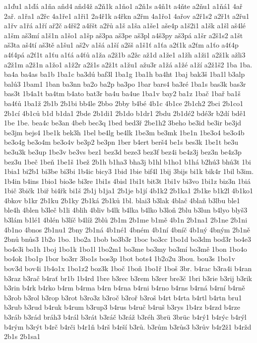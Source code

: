 {a1ďu1
a1ďá
a1ňa
aňd4
aňd4ž
a2ň1k
a1ňo1
a2ň1s
a4ň1t
a4ňte
a2ňu1
a1ňá1
4ař
2ař.
a1řa1
a2řc
4a1ře1
a1ři1
2a4ř1k
a4řkn
a2řm
4a1řo1
4ařov
a2ř1s2
a2ř1t
a2řu1
a1řv
a1řá
a1ří
ař2č
a4řš2
a4řšt
a2řů
a1š
a1ša
a1še1
aše4p
a1š2i1
a1šk
a1šl
aš4lé
a1šm
aš3mí
a1š1n
a1šo1
a1šp
aš3pa
aš3pe
aš3pl
a4š3py
aš3pá
a1šr
a2š1s2
a1št
aš3ta
aš4tí
aš3tě
a1šu1
aš2v
a1šá
a1ší
a2šš
a1š1ť
a1ťa
a2ť1k
a2ťm
a1ťo
a4ť4p
a4ť4pá
a2ť1t
a1ťu
a1ťá
a4ťů
a1ža
a2ž1b
a2žc
až1d
a1že1
a1žh
a1ži1
a2ž1k
ažli3
a2ž1m
a2ž1n
a1žo1
a1ž2r
a2ž1s
a2ž1t
a1žu1
ažu3r
a1žá
a1žé
a1ží
a2ž1š2
1ba
1ba.
ba4a
ba4as
ba1b
1ba1c
ba3dú
baf3l
1ba1g
1ba1h
ba4ht
1baj
bak3š
1ba1l
b3alp
balú3
1bam1
1ban
ba3nn
ba2o
ba2p
ba3po
1bar
bars4
ba3ré
1ba1s
bas3k
bas3r
bas3t
1b4a1t
ba4tm
b4ato
bat3r
ba4u
ba4ue
1ba1v
bay2
ba1z
1bač
1bař
ba1š
ba4ťů
1ba1ž
2b1b
2b1bi
bb4le
2bbo
2bby
b4bé
4b1c
4b1ce
2b1ch2
2bci
2b1co1
2b1cí
4b1ců
b1d
b1da1
2bde
2b1di1
2b1do
b1dr1
2bdu
2b1dé2
bdé3r
b2dí
bdě1
1be
1be.
bea4c
be3an
4beb
bec3q
1bed
bed3ř
2be1h2
3beho
be3id
be3ir
be3jd
be3jm
bejs4
1be1k
bek3h
1bel
be4lg
be4lk
1be3m
be3mk
1be1n
1be3o4
be3o4b
be3o4g
be3o4m
be3o4v
be3p2
be3pn
1ber
b4ert
berš4
be1s
bes3k
1be1t
be3u
be3u3k
be3up
1be3v
be3vs
bez1
bez3d
beze3
bez3f
bez4i
be4z3j
bez3n
be4z3p
bez3u
1beč
1beň
1be1š
1bež
2b1h
b1ha3
bha3j
b1hl
b1ho1
b1há
b2hú3
bhú3t
1bi
1bia1
bi2b1
bi3be
bi3bi
1b4ic
bicy3
1bid
1bie
bif4l
1bij
3bijs
bi1k
bik4r
1bil
b3im.
1b4in
b4ins
1bio1
bio3e
bi3re
1bi1s
4bisl
1bi1t
bit3t
1bi1v
bi3vo
1bi1z
biz3n
1biá
1bič
3bičk
1biř
bi4řk
bi1š
2b1j
b1ja1
2b1je
b1jí
4b1k2
2b1ka1
2b1ke
b1k2l
4b1ko1
4bkov
b1kr
2b1ku
2b1ky
2b1ká
2b1ků
1bl.
blai3
b3lak
4blač
4blaň
b3lbu
ble1
ble4h
4blen
b3leč
b1li
4blih
4bliv
b4lk
b4lka
b4lko
b3loň
2blu
b3lun
b4lyo
blyš3
b3lám
b1lé1
4blén
b3líč
b4líž
2blů
2b1m
2b1me
b1mě
4b1n
2b1na1
2b1ne
2b1ni
4b1no
4bnos
2b1nu1
2bny
2b1ná
4b1né1
4bném
4b1ní
4bníč
4b1ný
4bným
2b1ně
2bnů
bnůs3
1b2o
1bo.
1bo2a
1bob
bo3b3r
1boc
bo3cc
1bo1d
bo3dm
bod3r
bo4e3
bo4e3i
bo1h
1boj
1bo1k
1bo1l
1bo2m1
bo3me
bo3my
bo3mí
bo3mě
1bon
1bo4o
bo4ok
1bo1p
1bor
bo3rr
3bo1s
bos3p
1bot
bots4
1b2o2u
3bou.
bou3s
1bo1v
bov3d
bov4i
1b4o1x
1bo1z2
boz3k
1boč
1boň
1bo1ř
1boš
3br.
b4rac
b3ra4i
b4ran
b3raz
b3rač
b4rať
br1b
1b4rd
1bre
b3rec
b3rem
b3rer
bre3č
1bri
b3rie
b3rij
b3rik
b3rin
b4rk
b4rko
b4rm
b4rma
b4rn
b4rna
b4rni
b4rno
b4rns
b4rná
b4rní
b4rně
b3rob
b3rol
b3rop
b3rot
b3ro3z
b3roč
b3roř
b3roš
b4rt
b4rta
b4rtl
b4rtn
bru1
b3rub
b3rud
b4ruk
b4rum
b3rup3
b4rus
b4ruč
b4ruš
b3rys
1b4rz
b4rzd
b4rze
b3ráb
b3rád
bráh3
b4rál
b3rát
b3ráč
b3ráž
b3réh
3brü
3brüc
b4rý1
b4rýc
b4rýl
b4rým
b3rýt
b4rč
b4rči
b4r1ň
b4rš
b4rší
b3rů.
b3rům
b3růs3
b3rův
b4r2ž1
b4ržd
2b1s
2b1sa1
}
